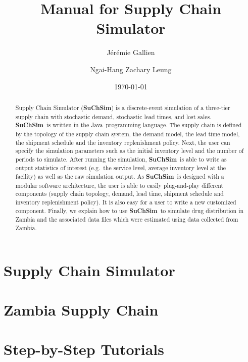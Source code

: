 \documentclass[12pt,oneside]{memoir}
\title{Manual for Supply Chain Simulator}
\author{%
J\'er\'emie Gallien%
\and Ngai-Hang Zachary Leung%
}
\date{\today}
\newcommand{\scs}{{\bfseries SuChSim}}
\begin{document}
\maketitle

\begin{abstract}
Supply Chain Simulator (\scs)
is a discrete-event simulation of a three-tier supply chain
with stochastic demand, stochastic lead times, and lost sales.
\scs\ is written in the Java\texttrademark\ programming language.
The supply chain is defined by the topology of the supply chain system,
the demand model, the lead time model,
the shipment schedule
and the inventory replenishment policy.
Next, the user can specify the simulation parameters
such as the initial inventory level
and the number of periods to simulate.
After running the simulation,
\scs\ is able to write as output
statistics of interest
(e.g.\ the service level, average inventory level at the facility)
as well as the raw simulation output.
As \scs\ is designed with a modular software architecture,
the user is able to easily plug-and-play different components
(supply chain topology, demand, lead time, shipment schedule
and inventory replenishment policy).
It is also easy for a user to write a new customized component.
Finally, we explain how to use \scs\
to simulate drug distribution in Zambia
and the associated data files which were estimated
using data collected from Zambia.
\end{abstract}

\newpage

\tableofcontents

\newpage








\part{Supply Chain Simulator}



\part{Zambia Supply Chain}



\part{Step-by-Step Tutorials}

\end{document}
